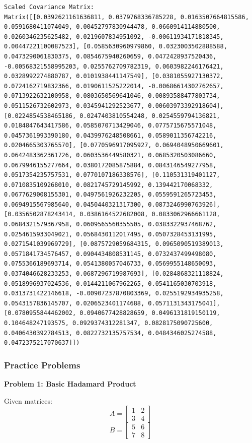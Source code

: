 \documentclass[
  letterpaper,
  DIV=11,
  numbers=noendperiod]{scrreprt}
\theoremstyle{plain}
\theoremstyle{definition}
\theoremstyle{remark}
\begin{document}
\begin{verbatim}
Scaled Covariance Matrix:
Matrix([[0.0392621161636811, 0.0379768336785228, 0.0163507664815586, 0.0591680411074049, 0.00452797830944478, 0.0660914114880500, 0.0260346235625482, 0.0219607834951092, -0.00611934171818345, 0.00447221100087523], [0.0585630960979860, 0.0323003502888588, 0.0473290061830375, 0.0854675940260659, 0.0472428937520436, -0.00568321558995203, 0.0255762709782319, 0.0603982246176421, 0.0328992274880787, 0.0101938441147549], [0.0381055927130372, 0.0724162719832366, 0.0190611525222014, -0.00686614302762657, 0.0713922632100958, 0.0803650569641046, 0.00893588477803734, 0.0511526732602973, 0.0345941292523677, 0.00603973392918604], [0.0224854538465186, 0.0247403810554248, 0.0254559794136821, 0.0184847643417586, 0.0585070713429046, 0.0775715675571048, 0.0457361993390180, 0.0439976248508661, 0.0589011356742216, 0.0204665303765570], [0.0770596917095927, 0.0694048950669601, 0.0642483362361726, 0.0603536449580321, 0.0685320503086660, 0.0679946155277664, 0.0380172085875884, 0.0843146549277958, 0.0517354235757531, 0.0770107186338576], [0.110531319401127, 0.0710835109268010, 0.0821745729145992, 0.139442170068332, 0.0677629008155301, 0.0497561926232205, 0.0559591265723453, 0.0694915567985640, 0.0450440321317300, 0.0873246990763926], [0.0356502878243414, 0.0386164522682008, 0.0833062966661128, 0.0684321579367958, 0.0609565560355505, 0.0383322937468762, 0.0254615933049021, 0.0568430112017495, 0.0507328453131995, 0.0271541039969729], [0.0875729059684315, 0.0965090519389013, 0.0571841734576457, 0.0904434808531145, 0.0732437499498080, 0.0755366189693714, 0.0541380057046733, 0.0569955148650093, 0.0374046628233253, 0.0687296719987693], [0.0284868321118824, 0.0518996937024536, 0.0144211067962265, 0.0541165030703918, 0.0313731422146618, -0.00907237870803369, 0.0255192934935258, 0.0543157836145707, 0.0206523401174688, 0.0571131343175041], [0.0780955844462002, 0.0940677428828659, 0.0496131819150119, 0.104648247193575, 0.0929374312281347, 0.0828175090725600, 0.0406430392784513, 0.0822732135757534, 0.0484346025274588, 0.0472375217070637]])
\end{verbatim}

\subsubsection*{Practice Problems}\label{practice-problems}

\textbf{Problem 1: Basic Hadamard Product}

Given matrices: \[A=\begin{bmatrix}1&2\\3&4\end{bmatrix}\]
\[B=\begin{bmatrix}5&6\\7&8\end{bmatrix}\]
\end{document}
